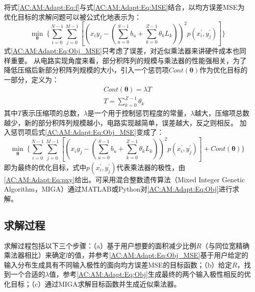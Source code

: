 将式\eqref{AC:AM:Adapt:Eq:f}与式\eqref{AC:AM:Adapt:Eq:MSE}结合，以均方误差MSE为优化目标的求解问题可以被公式化地表示为：
\begin{equation}
    \label{AC:AM:Adapt:Eq:Obj_MSE}
      \mathop{min}\limits_{\boldsymbol{\theta}}\ \{ \sum_{i=0}^{N-1} \sum_{j=0}^{M-1} [(x_iy_j - (\sum\limits_{u=0}^{S-1} b_u + \sum\limits_{k=0}^{Z-1} \theta_k L_k) )^2  p(x^{\prime}_i, y^{\prime}_j) ] \}
\end{equation}
式\eqref{AC:AM:Adapt:Eq:Obj_MSE}只考虑了误差，对近似乘法器来讲硬件成本也同样重要。
从电路实现角度来看，部分积阵列的规模与乘法器的性能强相关，为了降低压缩后新部分积阵列规模的大小，引入一个惩罚项$Cont(\boldsymbol{\theta})$作为优化目标的一部分，定义为：
\begin{align}
    Cont(\boldsymbol{\theta}) = \lambda T \label{AC:AM:Adapt:Eq:Cont} \\
    T = \sum_{k=0}^{Z-1} \theta_k \label{AC:AM:Adapt:Eq:T_exact}
\end{align}
其中$T$表示压缩项的总数，$\lambda$是一个用于控制惩罚程度的常量，$\lambda$越大，压缩项总数越少，新的部分积阵列规模越小，电路实现越简单，误差越大，反之则相反。
加入惩罚项后式\eqref{AC:AM:Adapt:Eq:Obj_MSE}变成了：
\begin{equation}
    \label{AC:AM:Adapt:Eq:Obj}
      \mathop{min}\limits_{\boldsymbol{\theta}}\ \{ \sum_{i=0}^{N-1} \sum_{j=0}^{M-1} [(x_iy_j - (\sum\limits_{u=0}^{S-1} b_u + \sum\limits_{k=0}^{Z-1} \theta_k L_k) )^2  p(x^{\prime}_i, y^{\prime}_j) ] +  Cont(\boldsymbol{\theta}) \}
\end{equation}
即为最终的优化目标，式中$p(x^{\prime}_i, y^{\prime}_j)$代表乘法器的极性，由\eqref{AC:AM:Adapt:Eq:pxy}给出。可采用混合整数遗传算法（Mixed
Integer Genetic Algorithm，MIGA）通过MATLAB或Python对\eqref{AC:AM:Adapt:Eq:Obj}进行求解。

\subsection{求解过程}

求解过程包括以下三个步骤：（a）基于用户想要的面积减少比例$R$（与同位宽精确乘法器相比）来确定$l$的值，并参考\eqref{AC:AM:Adapt:Eq:Obj_MSE}基于用户给定的输入分布生成具有不同输入极性的面向均方误差MSE的目标函数；（b）给定$R$，找到一个合适的$\lambda$值，参考\eqref{AC:AM:Adapt:Eq:Obj}生成最终的两个输入极性相反的优化目标；（c）通过MIGA求解目标函数并生成近似乘法器。

